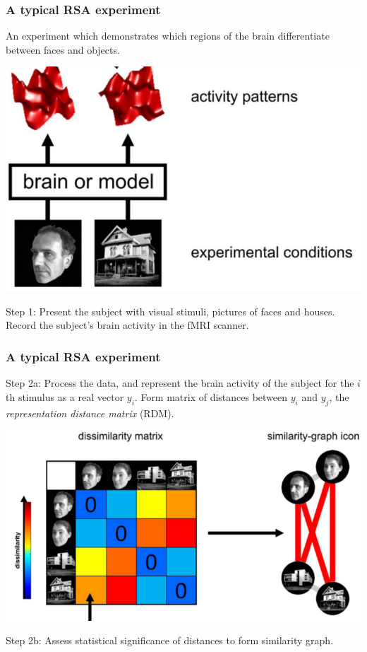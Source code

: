 \documentclass{beamer}
\begin{document}
\begin{frame}
\frametitle{A typical RSA experiment}
An experiment which demonstrates which regions of the brain differentiate between faces and objects.
\begin{center}
\includegraphics[scale = 0.3]{k08_step1.png}
\end{center}
Step 1: Present the subject with visual stimuli, pictures of faces and houses.
Record the subject's brain activity in the fMRI scanner.
\end{frame}

\begin{frame}
\frametitle{A typical RSA experiment}
Step 2a: Process the data, and represent the brain activity of the subject for the $i$th stimulus as a real vector $y_i$.
Form matrix of distances between $y_i$ and $y_j$, the \emph{representation distance matrix} (RDM).
\begin{center}
\includegraphics[scale = 0.3]{k08_step2.png}
\end{center}
Step 2b: Assess statistical significance of distances to form similarity graph.
\end{frame}
\end{document}
